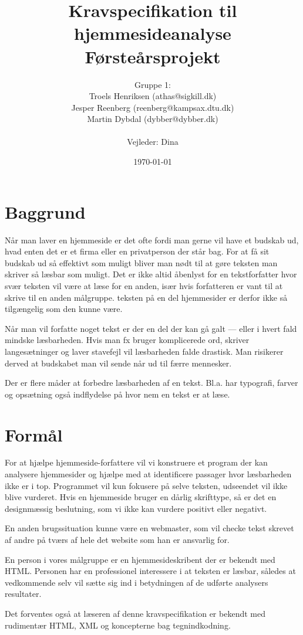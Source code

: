 \documentclass[a4paper,oneside,article]{memoir}
\title{Kravspecifikation til hjemmesideanalyse  \\
       \small{Førsteårsprojekt}}
\author{ Gruppe 1:\\
  Troels Henriksen (athas@sigkill.dk)\\
  Jesper Reenberg (reenberg@kampsax.dtu.dk)\\
  Martin Dybdal (dybber@dybber.dk)\\ \\
Vejleder: Dina
}
\date{\today}
\begin{document}
\maketitle

\section{Baggrund}
Når man laver en hjemmeside er det ofte fordi man gerne vil have et
budskab ud, hvad enten det er et firma eller en privatperson der står
bag. For at få sit budskab ud så effektivt som muligt bliver man nødt
til at gøre teksten man skriver så læsbar som muligt. Det er ikke altid
åbenlyst for en tekstforfatter hvor svær teksten vil være at læse for
en anden, især hvis forfatteren er vant til at skrive til en anden
målgruppe.  teksten på en del hjemmesider er derfor ikke så
tilgængelig som den kunne være.

Når man vil forfatte noget tekst er der en del der kan gå galt ---
eller i hvert fald mindske læsbarheden. Hvis man fx bruger
komplicerede ord, skriver langesætninger og laver stavefejl vil
læsbarheden falde drastisk. Man risikerer derved at budskabet man vil
sende når ud til færre mennesker.

Der er flere måder at forbedre læsbarheden af en tekst. Bl.a. har
typografi, farver og opsætning også indflydelse på hvor nem en tekst
er at læse.

\section{Formål}
For at hjælpe hjemmeside-forfattere vil vi konstruere et program der
kan analysere hjemmesider og hjælpe med at identificere passager hvor
læsbarheden ikke er i top. Programmet vil kun fokusere på selve
teksten, udseendet vil ikke blive vurderet. Hvis en hjemmeside bruger
en dårlig skrifttype, så er det en designmæssig beslutning, som vi
ikke kan vurdere positivt eller negativt.

En anden brugssituation kunne være en webmaster, som vil checke tekst
skrevet af andre på tværs af hele det website som han er ansvarlig
for.

En person i vores målgruppe er en hjemmesideskribent der er bekendt
med HTML. Personen har en professionel interessere i at teksten er
læsbar, således at vedkommende selv vil sætte sig ind i betydningen af
de udførte analysers resultater.

Det forventes også at læseren af denne kravspecifikation er bekendt
med rudimentær HTML, XML og koncepterne bag tegnindkodning.
\end{document}
